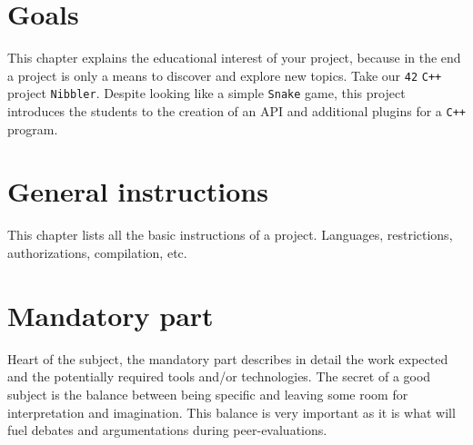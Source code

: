 \documentclass{42-en}
\begin{document}
\chapter{Goals}

    This chapter explains the educational interest of your project,
    because in the end a project is only a means to discover and
    explore new topics. Take our \texttt{42} \texttt{C++}
    project \texttt{Nibbler}. Despite looking like a simple
    \texttt{Snake} game, this project introduces the students to the
    creation of an API and additional plugins for a \texttt{C++} program.



\chapter{General instructions}

    This chapter lists all the basic instructions of a project.
    Languages, restrictions, authorizations, compilation, etc.



\chapter{Mandatory part}

    Heart of the subject, the mandatory part describes in detail the
    work expected and the potentially required tools and/or technologies.
    The secret of a good subject is the balance between
    being specific and leaving some room for interpretation and
    imagination. This balance is very important as it is what will
    fuel debates and argumentations during peer-evaluations.
\end{document}
